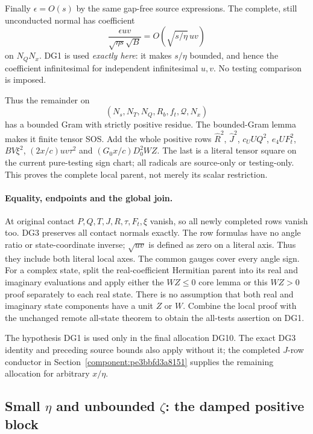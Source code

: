 Finally $\epsilon=O(s)$ by the same gap-free source expressions.
The complete, still unconducted normal has coefficient
\[
 \frac{\epsilon uv}{\sqrt{\eta s}\sqrt B}
         =O\!\left(\sqrt{s/\eta}\,uv\right)          \tag{DG10}
\]
on $N_QN_x$. DG1 is used \emph{exactly here}: it makes $s/\eta$
bounded, and hence the coefficient infinitesimal for independent
infinitesimal $u,v$. No testing comparison is imposed.

Thus the remainder on
\[
                  (N_s,N_T,N_Q,R_b,f_t,\mathcal Q,N_x)
\]
has a bounded Gram with strictly positive residue. The bounded-Gram
lemma makes it finite tensor SOS. Add the whole positive rows
$\widehat R^2$, $\widehat J^2$, $c_UUQ^2$, $e_4UF_t^2$,
$BV\xi^2$, $(2x/c)uv\tau^2$ and
$(G_0x/c)D_0^2WZ$. The last is a literal tensor square on the current
pure-testing sign chart; all radicals are source-only or testing-only.
This proves the complete local parent, not merely its scalar
restriction.

\paragraph{Equality, endpoints and the global join.}
At original contact $P,Q,T,J,R,\tau,F_t,\xi$ vanish, so all newly
completed rows vanish too. DG3 preserves all contact normals exactly.
The row formulas have no angle ratio or state-coordinate inverse;
$\sqrt{uv}$ is defined as zero on a literal axis. Thus they include
both literal local axes. The common gauges cover every angle sign.
For a complex state, split the real-coefficient Hermitian parent into
its real and imaginary evaluations and apply either the $WZ\le0$
core lemma or this $WZ>0$ proof separately to each real state. There
is no assumption that both real and imaginary state components have
a unit $Z$ or $W$. Combine the local proof with the unchanged remote
all-state theorem to obtain the all-tests assertion on DG1.

The hypothesis DG1 is used only in the final allocation DG10. The exact DG3 identity and preceding source bounds also apply without it; the completed $J$-row conductor in Section~\ref{component:pe3bbfd3a8151} supplies the remaining allocation for arbitrary $x/\eta$.



\subsection{Small $\eta$ and unbounded $\zeta$: the damped positive block}


